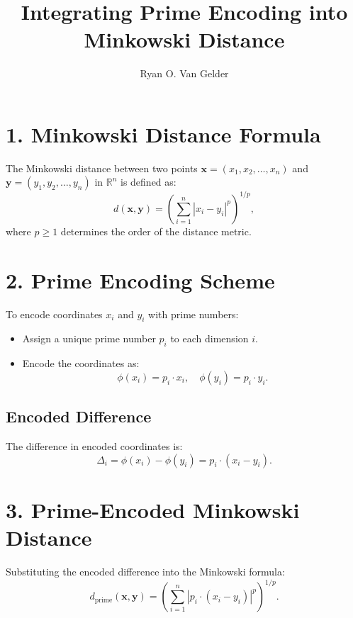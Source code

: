 \documentclass{article}
\theoremstyle{plain}
\begin{document}
\title{Integrating Prime Encoding into Minkowski Distance}
\author{Ryan O. Van Gelder}
\date{}
\maketitle

\section*{1. Minkowski Distance Formula}
The Minkowski distance between two points \( \mathbf{x} = (x_1, x_2, \dots, x_n) \) and \( \mathbf{y} = (y_1, y_2, \dots, y_n) \) in \( \mathbb{R}^n \) is defined as:
\begin{equation}
d(\mathbf{x}, \mathbf{y}) = \left( \sum_{i=1}^n |x_i - y_i|^p \right)^{1/p},
\end{equation}
where \( p \geq 1 \) determines the order of the distance metric.

\section*{2. Prime Encoding Scheme}
To encode coordinates \( x_i \) and \( y_i \) with prime numbers:
\begin{itemize}
    \item Assign a unique prime number \( p_i \) to each dimension \( i \).
    \item Encode the coordinates as:
    \begin{equation}
    \phi(x_i) = p_i \cdot x_i, \quad \phi(y_i) = p_i \cdot y_i.
    \end{equation}
\end{itemize}

\subsection*{Encoded Difference}
The difference in encoded coordinates is:
\begin{equation}
\Delta_i = \phi(x_i) - \phi(y_i) = p_i \cdot (x_i - y_i).
\end{equation}

\section*{3. Prime-Encoded Minkowski Distance}
Substituting the encoded difference into the Minkowski formula:
\begin{equation}
d_{\text{prime}}(\mathbf{x}, \mathbf{y}) = \left( \sum_{i=1}^n |p_i \cdot (x_i - y_i)|^p \right)^{1/p}.
\end{equation}
\end{document}
